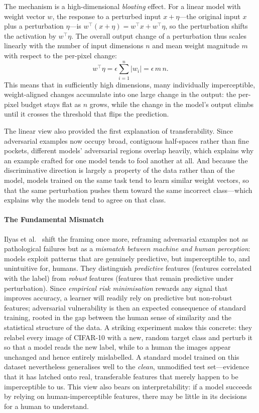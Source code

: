 \documentclass[review]{AIM_report}
\begin{document}
The mechanism is a high-dimensional \textit{bloating} effect. For a linear model with weight vector $w$, the response to a perturbed input $x+\eta$---the original input $x$ plus a perturbation $\eta$---is $w^\top(x+\eta) = w^\top x + w^\top\eta$, so the perturbation shifts the activation by $w^\top\eta$. The overall output change of a perturbation thus scales linearly with the number of input dimensions $n$ and mean weight magnitude $m$ with respect to the per-pixel change:
\[
w^\top\eta = \epsilon\sum_{i=1}^{n}\lvert w_i\rvert = \epsilon\, m\, n.
\]
This means that in sufficiently high dimensions, many individually imperceptible, weight-aligned changes accumulate into one large change in the output: the per-pixel budget stays flat as $n$ grows, while the change in the model's output climbs until it crosses the threshold that flips the prediction.


The linear view also provided the first explanation of transferability. Since adversarial examples now occupy broad, contiguous half-spaces rather than fine pockets, different models' adversarial regions overlap heavily, which explains why an example crafted for one model tends to fool another at all. And because the discriminative direction is largely a property of the data rather than of the model, models trained on the same task tend to learn similar weight vectors, so that the same perturbation pushes them toward the same incorrect class---which explains why the models tend to agree on that class. 

\paragraph{The Fundamental Mismatch}
Ilyas et al.~\cite{ilyas2019adversarial} shift the framing once more, reframing adversarial examples not as pathological failures but as a \textit{mismatch between machine and human perception}: models exploit patterns that are genuinely predictive, but imperceptible to, and unintuitive for, humans. They distinguish \textit{predictive} features (features correlated with the label) from \textit{robust} features (features that remain predictive under perturbation). Since \textit{empirical risk minimisation} rewards any signal that improves accuracy, a learner will readily rely on predictive but non-robust features; adversarial vulnerability is then an expected consequence of standard training, rooted in the gap between the human sense of similarity and the statistical structure of the data. A striking experiment makes this concrete: they relabel every image of CIFAR-10 with a new, random target class and perturb it so that a model reads the new label, while to a human the images appear unchanged and hence entirely mislabelled. A standard model trained on this dataset nevertheless generalises well to the \textit{clean}, unmodified test set---evidence that it has latched onto real, transferable features that merely happen to be imperceptible to us. This view also bears on interpretability: if a model succeeds by relying on human-imperceptible features, there may be little in its decisions for a human to understand.
\end{document}
